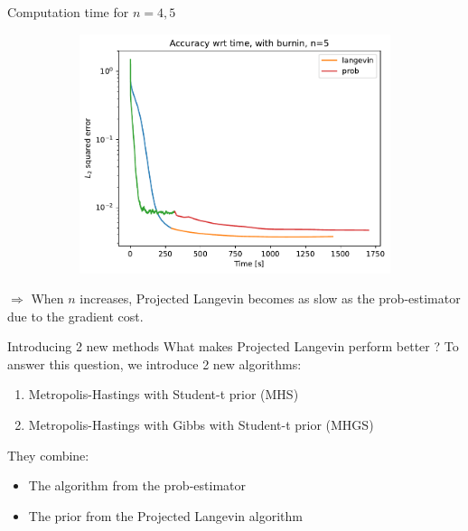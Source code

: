\documentclass{beamer}
\begin{document}
\begin{frame}{Computation time for $n=4,5$}
\begin{figure}[H]
\begin{subfigure}[b]{0.49\textwidth}
            
            \includegraphics[width=\linewidth]{figures/experiments/baseline/diff_n_qubits/iters_acc_comp_time_no_avg_n5-1.png}
        \end{subfigure}
        \label{fig:conv-plot-diff-n}
    \end{figure}
    $\Longrightarrow$ When $n$ increases, Projected Langevin becomes as slow as the prob-estimator due to the gradient cost.

\end{frame}

\begin{frame}{Introducing 2 new methods}
    What makes Projected Langevin perform better ?\medbreak
    To answer this question, we introduce 2 new algorithms:
    \begin{enumerate} 
    \item Metropolis-Hastings with Student-t prior (MHS)
    \item Metropolis-Hastings with Gibbs with Student-t prior (MHGS)
    \end{enumerate}
    They combine:
    \begin{itemize}
        \item The algorithm from the prob-estimator
        \item The prior from the Projected Langevin algorithm
    \end{itemize}
\end{frame}
\end{document}
